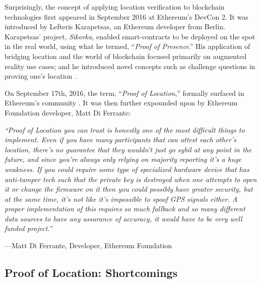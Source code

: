 \documentclass{article}
\begin{document}
Surprisingly, the concept of applying location verification to blockchain technologies first appeared in September 2016 at Ethereum's DevCon 2. It was introduced by Lefteris Karapetsas, an Ethereum developer from Berlin. Karapetsas' project, \textit{Sikorka}, enabled \glspl{smart-contract} to be deployed on the spot in the real world, using what he termed, ``\textit{Proof of Presence}.'' His application of bridging location and the world of blockchain focused primarily on augmented reality use cases; and he introduced novel concepts such as challenge questions in proving one's location \cite{karapetsas-sikorka}.

On September 17th, 2016, the term, ``\textit{Proof of Location},'' formally surfaced in Ethereum's community \cite{diferrante-proofoflocation}. It was then further expounded upon by Ethereum Foundation developer, Matt Di Ferrante:

\begin{displayquote}\textit{``Proof of Location you can trust is honestly one of the most difficult things to implement. Even if you have many participants that can attest each other's location, there's no guarantee that they wouldn't just go sybil at any point in the future, and since you're always only relying on majority reporting it's a huge weakness.
If you could require some type of specialized hardware device that has anti-tamper tech such that the private key is destroyed when one attempts to open it or change the firmware on it then you could possibly have greater security, but at the same time, it's not like it's impossible to spoof GPS signals either.
A proper implementation of this requires so much fallback and so many different data sources to have any assurance of accuracy, it would have to be very well funded project.''} \cite{diferrante-proofoflocation}

\vspace{2mm}
---Matt Di Ferrante, Developer, Ethereum Foundation
\end{displayquote}


\subsection {Proof of Location: Shortcomings}
\end{document}
